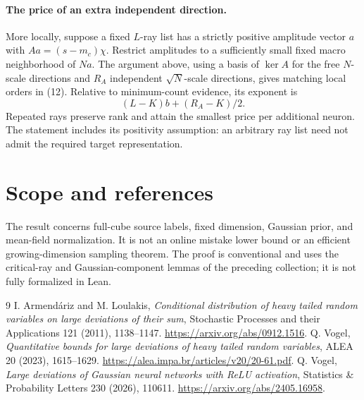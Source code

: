 \documentclass[11pt]{article}
\begin{document}
\paragraph{The price of an extra independent direction.}
More locally, suppose a fixed $L$-ray list has a strictly positive
amplitude vector $a$ with $Aa=(s-m_c)\chi$. Restrict amplitudes to a
sufficiently small fixed macro neighborhood of $Na$. The argument above,
using a basis of $\ker A$ for the free $N$-scale directions and
$R_A$ independent $\sqrt N$-scale directions, gives matching local
orders in (12). Relative to minimum-count evidence, its exponent is
\[
                         (L-K)b+(R_A-K)/2.               \tag{16}
\]
Repeated rays preserve rank and attain the smallest price per additional
neuron. The statement includes its positivity assumption: an arbitrary
ray list need not admit the required target representation.

\section*{Scope and references}
The result concerns full-cube source labels, fixed dimension, Gaussian
prior, and mean-field normalization. It is not an online mistake lower
bound or an efficient growing-dimension sampling theorem. The proof is
conventional and uses the critical-ray and Gaussian-component lemmas of
the preceding collection; it is not fully formalized in Lean.

\begin{thebibliography}{9}
 I. Armend\'ariz and M. Loulakis,
\emph{Conditional distribution of heavy tailed random variables on large
deviations of their sum}, Stochastic Processes and their Applications
121 (2011), 1138--1147. \url{https://arxiv.org/abs/0912.1516}.
 Q. Vogel, \emph{Quantitative bounds for large deviations of
heavy tailed random variables}, ALEA 20 (2023), 1615--1629.
\url{https://alea.impa.br/articles/v20/20-61.pdf}.
 Q. Vogel, \emph{Large deviations of Gaussian neural
networks with ReLU activation}, Statistics \& Probability Letters 230
(2026), 110611. \url{https://arxiv.org/abs/2405.16958}.
\end{thebibliography}
\end{document}
